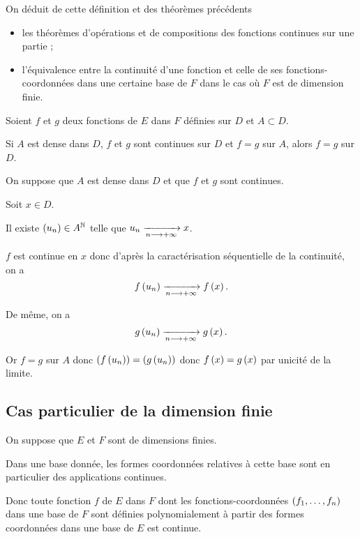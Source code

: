 On déduit de cette définition et des théorèmes précédents

\begin{itemize}
    \item les théorèmes d'opérations et de compositions des fonctions continues sur une partie ; \\
    \item l'équivalence entre la continuité d'une fonction et celle de ses fonctions-coordonnées dans une certaine base de \(F\) dans le cas où \(F\) est de dimension finie.
\end{itemize}

\begin{prop}
Soient \(f\) et \(g\) deux fonctions de \(E\) dans \(F\) définies sur \(D\) et \(A\subset D\).

Si \(A\) est dense dans \(D\), \(f\) et \(g\) sont continues sur \(D\) et \(f=g\) sur \(A\), alors \(f=g\) sur \(D\).
\end{prop}

\begin{dem}
On suppose que \(A\) est dense dans \(D\) et que \(f\) et \(g\) sont continues.

Soit \(x\in D\).

Il existe \(\left(u_n\right)\in A^{\mathbb{N}}\) telle que \(u_n\xrightarrow[n\longrightarrow+\infty]{}x\).

\(f\) est continue en \(x\) donc d'après la caractérisation séquentielle de la continuité, on a \[f\left(u_n\right)\xrightarrow[n\longrightarrow+\infty]{}f\left(x\right).\]

De même, on a \[g\left(u_n\right)\xrightarrow[n\longrightarrow+\infty]{}g\left(x\right).\]

Or \(f=g\) sur \(A\) donc \(\left(f\left(u_n\right)\right)=\left(g\left(u_n\right)\right)\) donc \(f\left(x\right)=g\left(x\right)\) par unicité de la limite.
\end{dem}

\subsection{Cas particulier de la dimension finie}

On suppose que \(E\) et \(F\) sont de dimensions finies.

Dans une base donnée, les formes coordonnées relatives à cette base sont en particulier des applications continues.

Donc toute fonction \(f\) de \(E\) dans \(F\) dont les fonctions-coordonnées \(\left(f_1,\dots,f_n\right)\) dans une base de \(F\) sont définies polynomialement à partir des formes coordonnées dans une base de \(E\) est continue.

